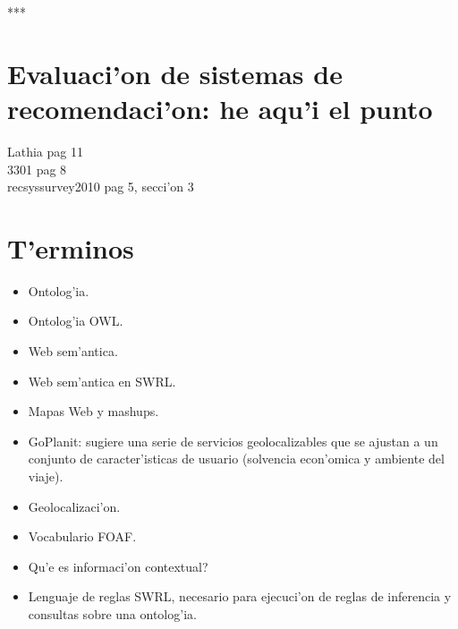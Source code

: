 \documentclass[11pt]{article}
\begin{document}
***


\section{Evaluaci'on de sistemas de recomendaci'on: he aqu'i el punto}
Lathia pag 11\\
3301 pag 8\\
recsyssurvey2010 pag 5, secci'on 3\\


\section{T'erminos}
\begin{itemize}
\item Ontolog'ia.
\item Ontolog'ia OWL.
\item Web sem'antica.
\item Web sem'antica en SWRL.
\item Mapas Web y mashups.
\item GoPlanit: sugiere una serie de servicios geolocalizables que se ajustan a un conjunto de caracter'isticas de usuario (solvencia econ'omica y ambiente del viaje).
\item Geolocalizaci'on.
\item Vocabulario FOAF.
\item Qu'e es informaci'on contextual?
\item Lenguaje de reglas SWRL, necesario para ejecuci'on de reglas de inferencia y consultas sobre una ontolog'ia.
\end{itemize}





\end{document}

